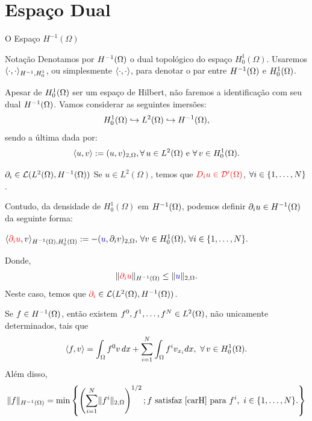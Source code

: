 \section{Espaço Dual}

\begin{frame}{O Espaço \(H^{-1}(\Omega)\)}
\begin{exampleblock}{Notação}
Denotamos por \(\hd\) o dual topológico do espaço \(H_0^1(\Omega)\). Usaremos  \(\langle\cdot,\cdot\rangle_{H^{-1},H_0^1}\), ou simplesmente \(\langle\cdot,\cdot\rangle\), para denotar o par entre \(\hd\) e \(H_0^1(\Omega)\).
\end{exampleblock}
Apesar de \(H_0^1(\Omega)\) ser um espaço de Hilbert, não faremos a identificação com seu dual \(\hd\). Vamos considerar as seguintes imersões:
\[
H_0^1(\Omega)\hookrightarrow L^2(\Omega)\hookrightarrow H^{-1}(\Omega),
\]
sendo a última dada por:
\[
\langle u,v\rangle:=(u,v)_{2,\Omega}, \forall\, u\in L^2(\Omega) \text{ e } \forall\, v\in H_0^1(\Omega).
\]
\end{frame}
\begin{frame}{\({\partial_i}\in \mathcal{L}( L^2(\Omega),H^{-1}(\Omega))\)}
Se {\color{blue}\(u\in L^2(\Omega)\)}, temos que \({\color{red}D_i u\in \mathcal{D}'(\Omega)}\), \(\forall i\in \{1,\ldots,N\}\).
\bigskip

Contudo, da densidade de \(H_0^1(\Omega)\) em \(\hd\), podemos definir {\color{red}\(\partial_i u\in H^{-1}(\Omega)\)} da seguinte forma:

\begin{center}
\begin{minipage}{0.73\textwidth}
\begin{block}{}
\(\langle{\color{red}\partial_i u},v\rangle_{H^{-1}(\Omega),H_0^1(\Omega)}:=-({\color{blue}u},\partial_i v)_{2,\Omega}, \, \forall v\in H_0^1(\Omega),\, \forall i\in \{1,\ldots,N\}. \)
\end{block}
\end{minipage}
\end{center}
Donde,
\[
\lVert{\color{red}\partial_iu}\rVert_{H^{-1}(\Omega)}\leq \lVert{\color{blue}u}\rVert_{2,\Omega}.
\]
Neste caso, temos que \({\color{red}\partial_i}\in \mathcal{L}( L^2(\Omega),H^{-1}(\Omega))\).
\end{frame}
\begin{frame}
\begin{teo}[Caracterização de \(\hd\)]
Se \(f\in H^{-1}(\Omega)\), então existem \(f^0, f^1, \ldots, f^N\in L^2(\Omega)\), não unicamente determinados, tais que 
\begin{equation}\label{carH}
\langle f,v\rangle=\int_\Omega f^0v\,dx+\sum_{i=1}^{N} \int_\Omega f^iv_{x_i}dx,\ \forall\, v\in H_0^1(\Omega).
\end{equation}
Além disso, 
\[\lVert f\rVert_{H^{-1}(\Omega)}=\min\left\{\left(\sum_{i=1}^{N} \lVert f^i\rVert_{2,\Omega}\right)^{1/2}; f \text{ satisfaz  \eqref{carH} para } f^i,\ i\in\{1,\ldots,N\}.   \right\}
\]
\end{teo}
\end{frame}